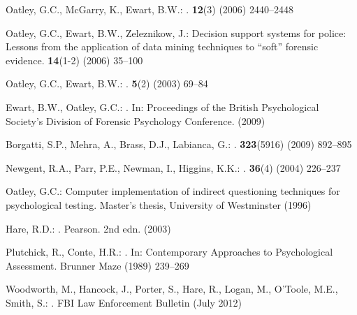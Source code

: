 \documentclass{llncs}
\begin{document}
\begin{thebibliography}{10}
Oatley, G.C., McGarry, K., Ewart, B.W.:
.
  \textbf{12}(3) (2006)  2440--2448

Oatley, G.C., Ewart, B.W., Zeleznikow, J.:
\newblock Decision support systems for police: Lessons from the application of
  data mining techniques to ``soft'' forensic evidence.
 \textbf{14}(1-2) (2006)  35--100

Oatley, G.C., Ewart, B.W.:
.
  \textbf{5}(2) (2003)  69--84

Ewart, B.W., Oatley, G.C.:
.
\newblock In: Proceedings of the British Psychological Society's Division of
  Forensic Psychology Conference. (2009)

Borgatti, S.P., Mehra, A., Brass, D.J., Labianca, G.:
.
 \textbf{323}(5916) (2009)  892--895

Newgent, R.A., Parr, P.E., Newman, I., Higgins, K.K.:
.
  \textbf{36}(4) (2004)  226--237

Oatley, G.C.:
\newblock Computer implementation of indirect questioning techniques for
  psychological testing.
\newblock Master's thesis, University of Westminster (1996)

Hare, R.D.:
.
\newblock Pearson. 2nd edn. (2003)

Plutchick, R., Conte, H.R.:
.
\newblock In: {Contemporary Approaches to Psychological Assessment}. Brunner
  Maze (1989)  239--269

Woodworth, M., Hancock, J., Porter, S., Hare, R., Logan, M., O’Toole, M.E.,
  Smith, S.:
.
\newblock FBI Law Enforcement Bulletin (July 2012)


\end{thebibliography}
\end{document}
